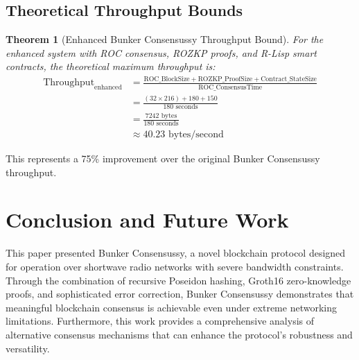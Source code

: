 \documentclass[11pt,a4paper]{article}
\newtheorem{theorem}{Theorem}[section]
\begin{document}
\subsection{Theoretical Throughput Bounds}

\begin{theorem}[Enhanced Bunker Consensussy Throughput Bound]
For the enhanced system with ROC consensus, ROZKP proofs, and R-Lisp smart contracts, the theoretical maximum throughput is:
\begin{align}
\text{Throughput}_{\text{enhanced}} &= \frac{\text{ROC\_BlockSize} + \text{ROZKP\_ProofSize} + \text{Contract\_StateSize}}{\text{ROC\_ConsensusTime}}\\
&= \frac{(32 \times 216) + 180 + 150}{180 \text{ seconds}}\\
&= \frac{7242 \text{ bytes}}{180 \text{ seconds}}\\
&\approx 40.23 \text{ bytes/second}
\end{align}
\end{theorem}

This represents a 75\% improvement over the original Bunker Consensussy throughput.

\section{Conclusion and Future Work}

This paper presented Bunker Consensussy, a novel blockchain protocol designed for operation over shortwave radio networks with severe bandwidth constraints. Through the combination of recursive Poseidon hashing, Groth16 zero-knowledge proofs, and sophisticated error correction, Bunker Consensussy demonstrates that meaningful blockchain consensus is achievable even under extreme networking limitations. Furthermore, this work provides a comprehensive analysis of alternative consensus mechanisms that can enhance the protocol's robustness and versatility.
\end{document}
